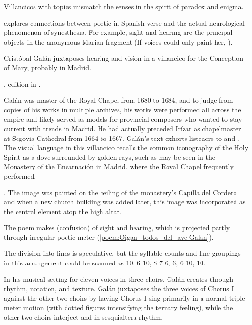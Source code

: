 Villancicos with  topics mismatch the senses in the spirit
of paradox and enigma.%
\begin{Footnote}
    \Autocite{DoetschKraus:Sinestesia} explores connections between poetic
     in Spanish verse and the actual
    neurological phenomenon of synesthesia.  
    For example, sight and hearing are the principal objects in the anonymous
    Marian fragment  (If voices
    could only paint her, ).
\end{Footnote}
Cristóbal Galán juxtaposes hearing and vision in a villancico for the Conception
of Mary, probably in Madrid.%
\begin{Footnote}
    , edition in \autocite[567--568]{CaberoPueyo:PhD}.
\end{Footnote}
Galán was master of the Royal Chapel from 1680 to 1684, and to judge from copies
of his works in multiple archives, his works were performed all across the
empire and likely served as models for provincial composers who wanted to stay
current with trends in Madrid.
He had actually preceded Irízar as chapelmaster at Segovia Cathedral from 1664
to 1667.%
    \Autocite{Baron-Sage:GalanC}
Galán's text exhorts listeners to  and .
The visual language in this villancico recalls the common iconography of the
Holy Spirit as a dove surrounded by golden rays, such as may be seen in the
Monastery of the Encarnación in Madrid, where the Royal Chapel frequently
performed.%
\begin{Footnote}
    \Autocite[69--70, 81]{Sanz:GuiaDescalzasEncarnacion}.
    The image was painted on the ceiling of the monastery's Capilla del Cordero
    and when a new church building was added later, this image was incorporated
    as the central element atop the high altar.
\end{Footnote}
The poem makes  (confusion) of sight and hearing, which is
projected partly through irregular poetic meter
(\cref{poem:Oigan_todos_del_ave-Galan}).%
\begin{Footnote}
    The division into lines is speculative, but the syllable counts and line
    groupings in this arrangement could be scanned as  10, 6 10, 8 7 6, 6, 6 10,
    10.
\end{Footnote}
In his musical setting for eleven voices in three choirs, Galán creates
 through rhythm, notation, and texture.  
Galán juxtaposes the three voices of Chorus I against the other two choirs by
having Chorus I sing primarily in a normal triple-meter motion (with dotted
figures intensifying the ternary feeling), while the other two choirs interject
 and  in sesquialtera rhythm.

